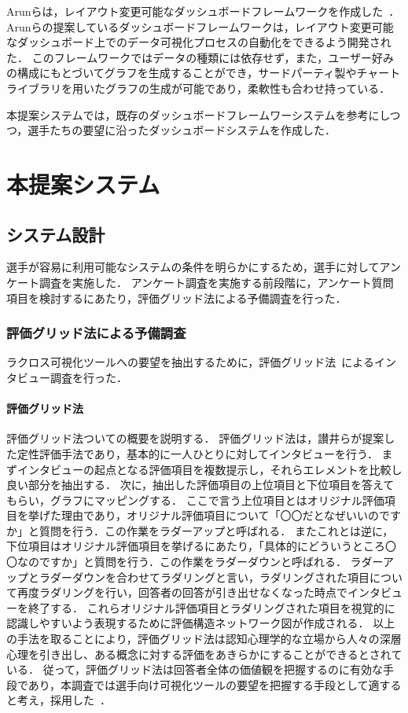 \documentclass[sotsuron]{kuee}
\begin{document}
	Arunらは，レイアウト変更可能なダッシュボードフレームワークを作成した~\cite{dashboard}．
	Arunらの提案しているダッシュボードフレームワークは，レイアウト変更可能なダッシュボード上でのデータ可視化プロセスの自動化をできるよう開発された．
	このフレームワークではデータの種類には依存せず，また，ユーザー好みの構成にもとづいてグラフを生成することができ，サードパーティ製やチャートライブラリを用いたグラフの生成が可能であり，柔軟性も合わせ持っている．
	
	本提案システムでは，既存のダッシュボードフレームワーシステムを参考にしつつ，選手たちの要望に沿ったダッシュボードシステムを作成した．

\chapter{本提案システム}
	\section{システム設計}
		選手が容易に利用可能なシステムの条件を明らかにするため，選手に対してアンケート調査を実施した．
		アンケート調査を実施する前段階に，アンケート質問項目を検討するにあたり，評価グリッド法による予備調査を行った．
		\subsection{評価グリッド法による予備調査}
			ラクロス可視化ツールへの要望を抽出するために，評価グリッド法~\cite{EGM}によるインタビュー調査を行った．
			\subsubsection{評価グリッド法}
				評価グリッド法ついての概要を説明する．
				評価グリッド法は，讃井らが提案した定性評価手法であり，基本的に一人ひとりに対してインタビューを行う．
				まずインタビューの起点となる評価項目を複数提示し，それらエレメントを比較し良い部分を抽出する．
				次に，抽出した評価項目の上位項目と下位項目を答えてもらい，グラフにマッピングする．
				ここで言う上位項目とはオリジナル評価項目を挙げた理由であり，オリジナル評価項目について「〇〇だとなぜいいのですか」と質問を行う．この作業をラダーアップと呼ばれる．
				またこれとは逆に，下位項目はオリジナル評価項目を挙げるにあたり，「具体的にどういうところ〇〇なのですか」と質問を行う．この作業をラダーダウンと呼ばれる．
				ラダーアップとラダーダウンを合わせてラダリングと言い，ラダリングされた項目について再度ラダリングを行い，回答者の回答が引き出せなくなった時点でインタビューを終了する．
				これらオリジナル評価項目とラダリングされた項目を視覚的に認識しやすいよう表現するために評価構造ネットワーク図が作成される．
				以上の手法を取ることにより，評価グリッド法は認知心理学的な立場から人々の深層心理を引き出し、ある概念に対する評価をあきらかにすることができるとされている．
				従って，評価グリッド法は回答者全体の価値観を把握するのに有効な手段であり，本調査では選手向け可視化ツールの要望を把握する手段として適すると考え，採用した~\cite{EGM}．
\end{document}
